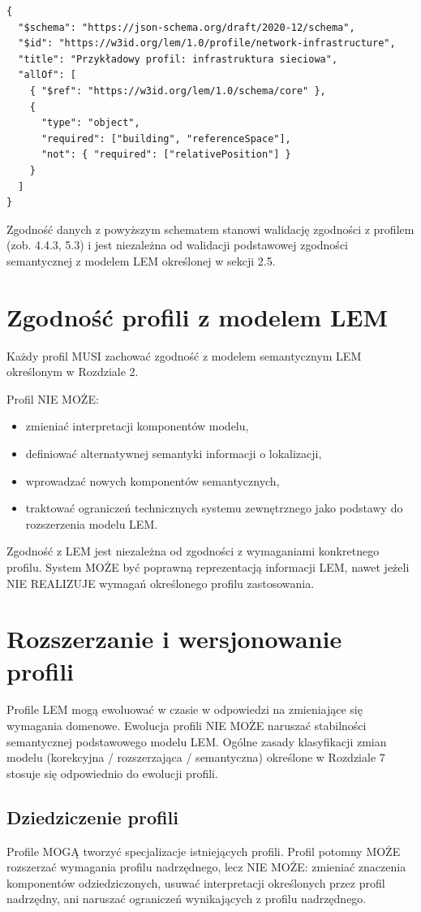 \begin{verbatim}
{
  "$schema": "https://json-schema.org/draft/2020-12/schema",
  "$id": "https://w3id.org/lem/1.0/profile/network-infrastructure",
  "title": "Przykładowy profil: infrastruktura sieciowa",
  "allOf": [
    { "$ref": "https://w3id.org/lem/1.0/schema/core" },
    {
      "type": "object",
      "required": ["building", "referenceSpace"],
      "not": { "required": ["relativePosition"] }
    }
  ]
}
\end{verbatim}

Zgodność danych z powyższym schematem stanowi walidację zgodności z profilem (zob. 4.4.3, 5.3) i jest niezależna od walidacji podstawowej zgodności semantycznej z modelem LEM określonej w sekcji 2.5.

\section{Zgodność profili z modelem LEM}
Każdy profil MUSI zachować zgodność z modelem semantycznym LEM określonym w Rozdziale 2.

Profil NIE MOŻE:
\begin{itemize}
    \item zmieniać interpretacji komponentów modelu,
    \item definiować alternatywnej semantyki informacji o lokalizacji,
    \item wprowadzać nowych komponentów semantycznych,
    \item traktować ograniczeń technicznych systemu zewnętrznego jako podstawy do rozszerzenia modelu LEM.
\end{itemize}

Zgodność z LEM jest niezależna od zgodności z wymaganiami konkretnego profilu. System MOŻE być poprawną reprezentacją informacji LEM, nawet jeżeli NIE REALIZUJE wymagań określonego profilu zastosowania.

\section{Rozszerzanie i wersjonowanie profili}
Profile LEM mogą ewoluować w czasie w odpowiedzi na zmieniające się wymagania domenowe. Ewolucja profili NIE MOŻE naruszać stabilności semantycznej podstawowego modelu LEM. Ogólne zasady klasyfikacji zmian modelu (korekcyjna / rozszerzająca / semantyczna) określone w Rozdziale 7 stosuje się odpowiednio do ewolucji profili.

\subsection{Dziedziczenie profili}
Profile MOGĄ tworzyć specjalizacje istniejących profili. Profil potomny MOŻE rozszerzać wymagania profilu nadrzędnego, lecz NIE MOŻE: zmieniać znaczenia komponentów odziedziczonych, usuwać interpretacji określonych przez profil nadrzędny, ani naruszać ograniczeń wynikających z profilu nadrzędnego.

